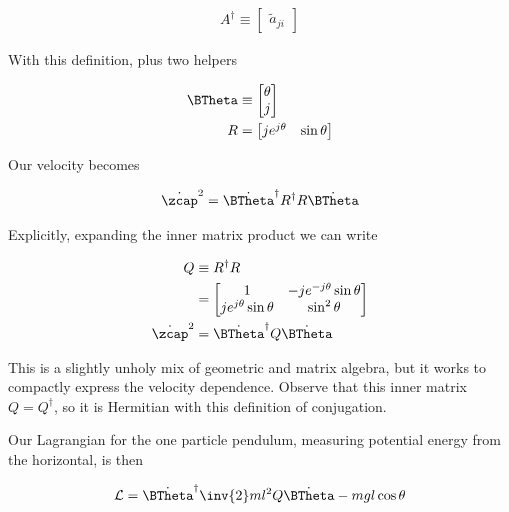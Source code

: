 \begin{align}\label{eqn:sPolarMultiPendulum:zoo6}
A^\dagger \equiv
\begin{bmatrix}
\tilde{a}_{ji}
\end{bmatrix}
\end{align}

With this definition, plus two helpers

\begin{align}\label{eqn:sPolarMultiPendulum:zoo7}
\BTheta &\equiv
\begin{bmatrix}
\theta \\ j
\end{bmatrix} \\
R &= 
\begin{bmatrix}
j e^{j\theta} & \sin\theta
\end{bmatrix}
\end{align}

Our velocity becomes

\begin{align}\label{eqn:sPolarMultiPendulum:zoo8}
{\dot{\zcap}}^2 
&= {\dot{\BTheta}}^\dagger R^\dagger R \dot{\BTheta} \\
\end{align}

Explicitly, expanding the inner matrix product we can write

\begin{align}\label{eqn:sPolarMultiPendulum:zoo9}
Q &\equiv R^\dagger R \\
&=
\begin{bmatrix}
1 & -j e^{-j\theta} \sin\theta \\
j e^{j\theta} \sin\theta & \sin^2 \theta
\end{bmatrix} \\
{\dot{\zcap}}^2 
&= {\dot{\BTheta}}^\dagger Q \dot{\BTheta} \\
\end{align}

This is a slightly unholy mix of geometric and matrix algebra, but it works to compactly express the velocity dependence.  Observe that this inner matrix $Q = Q^\dagger$, so it is Hermitian with this definition of conjugation.

Our Lagrangian for the one particle pendulum, measuring potential energy from the horizontal, is then

\begin{align}\label{eqn:sPolarMultiPendulum:zoo10}
\LL = {\dot{\BTheta}}^\dagger \inv{2} m l^2 Q \dot{\BTheta} - m g l \cos\theta
\end{align}

